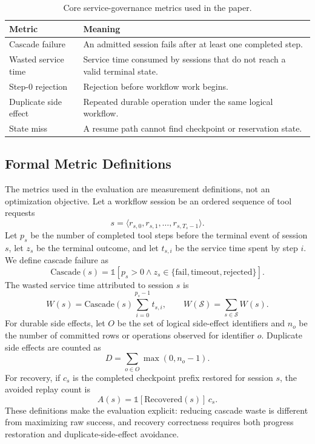 \documentclass[5p,times]{elsarticle}
\begin{document}
\begin{table}[t]
\centering
\caption{Core service-governance metrics used in the paper.}
\label{tab:core_metrics}
\footnotesize
\begin{tabular}{@{}>{\raggedright\arraybackslash}p{}>{\raggedright\arraybackslash}p{}@{}}
\toprule
\textbf{Metric} & \textbf{Meaning} \\
\midrule
Cascade failure & An admitted session fails after at least one completed step. \\
Wasted service time & Service time consumed by sessions that do not reach a valid terminal state. \\
Step-0 rejection & Rejection before workflow work begins. \\
Duplicate side effect & Repeated durable operation under the same logical workflow. \\
State miss & A resume path cannot find checkpoint or reservation state. \\
\bottomrule
\end{tabular}
\end{table}

\subsection{Formal Metric Definitions}

The metrics used in the evaluation are measurement definitions, not an optimization objective. Let a workflow session be an ordered sequence of tool requests
\begin{equation}
s=\langle r_{s,0}, r_{s,1}, \ldots, r_{s,T_s-1}\rangle .
\end{equation}
Let $p_s$ be the number of completed tool steps before the terminal event of session $s$, let $z_s$ be the terminal outcome, and let $t_{s,i}$ be the service time spent by step $i$. We define cascade failure as
\begin{equation}
\mathrm{Cascade}(s)=
\mathbb{1}\!\left[p_s>0 \land z_s \in
\{\mathrm{fail},\mathrm{timeout},\mathrm{rejected}\}\right].
\end{equation}
The wasted service time attributed to session $s$ is
\begin{equation}
W(s)=\mathrm{Cascade}(s)\sum_{i=0}^{p_s-1} t_{s,i},
\qquad
W(\mathcal{S})=\sum_{s\in\mathcal{S}} W(s).
\end{equation}
For durable side effects, let $O$ be the set of logical side-effect identifiers and $n_o$ be the number of committed rows or operations observed for identifier $o$. Duplicate side effects are counted as
\begin{equation}
D=\sum_{o\in O}\max(0,n_o-1).
\end{equation}
For recovery, if $c_s$ is the completed checkpoint prefix restored for session $s$, the avoided replay count is
\begin{equation}
A(s)=\mathbb{1}[\mathrm{Recovered}(s)]\,c_s .
\end{equation}
These definitions make the evaluation explicit: reducing cascade waste is different from maximizing raw success, and recovery correctness requires both progress restoration and duplicate-side-effect avoidance.
\end{document}
